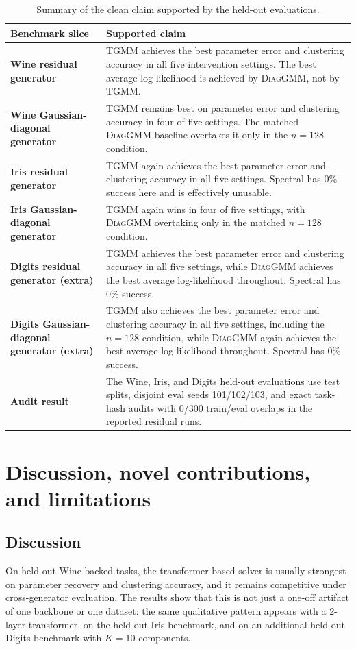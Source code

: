 \documentclass{article}
\newcommand{\tgmm}{\textsc{TGMM}}
\newcommand{\diaggmm}{\textsc{DiagGMM}}
\begin{document}
\begin{table}[t]
\centering
\small
\caption{Summary of the clean claim supported by the held-out evaluations.}
\label{tab:claim-summary}
\begin{tabularx}{\linewidth}{>{\bfseries}l X}
\toprule
Benchmark slice & Supported claim \\
\midrule
Wine residual generator & \tgmm{} achieves the best parameter error and clustering accuracy in all five intervention settings. The best average log-likelihood is achieved by \diaggmm{}, not by \tgmm{}. \\
Wine Gaussian-diagonal generator & \tgmm{} remains best on parameter error and clustering accuracy in four of five settings. The matched \diaggmm{} baseline overtakes it only in the $n=128$ condition. \\
Iris residual generator & \tgmm{} again achieves the best parameter error and clustering accuracy in all five settings. Spectral has 0\% success here and is effectively unusable. \\
Iris Gaussian-diagonal generator & \tgmm{} again wins in four of five settings, with \diaggmm{} overtaking only in the matched $n=128$ condition. \\
Digits residual generator (extra) & \tgmm{} achieves the best parameter error and clustering accuracy in all five settings, while \diaggmm{} achieves the best average log-likelihood throughout. Spectral has 0\% success. \\
Digits Gaussian-diagonal generator (extra) & \tgmm{} also achieves the best parameter error and clustering accuracy in all five settings, including the $n=128$ condition, while \diaggmm{} again achieves the best average log-likelihood throughout. Spectral has 0\% success. \\
Audit result & The Wine, Iris, and Digits held-out evaluations use test splits, disjoint eval seeds 101/102/103, and exact task-hash audits with 0/300 train/eval overlaps in the reported residual runs. \\
\bottomrule
\end{tabularx}
\end{table}

\section{Discussion, novel contributions, and limitations}
\subsection{Discussion}
 On held-out Wine-backed tasks, the transformer-based solver is usually strongest on parameter recovery and clustering accuracy, and it remains competitive under cross-generator evaluation. The results show that this is not just a one-off artifact of one backbone or one dataset: the same qualitative pattern appears with a 2-layer transformer, on the held-out Iris benchmark, and on an additional held-out Digits benchmark with $K=10$ components.
\end{document}
